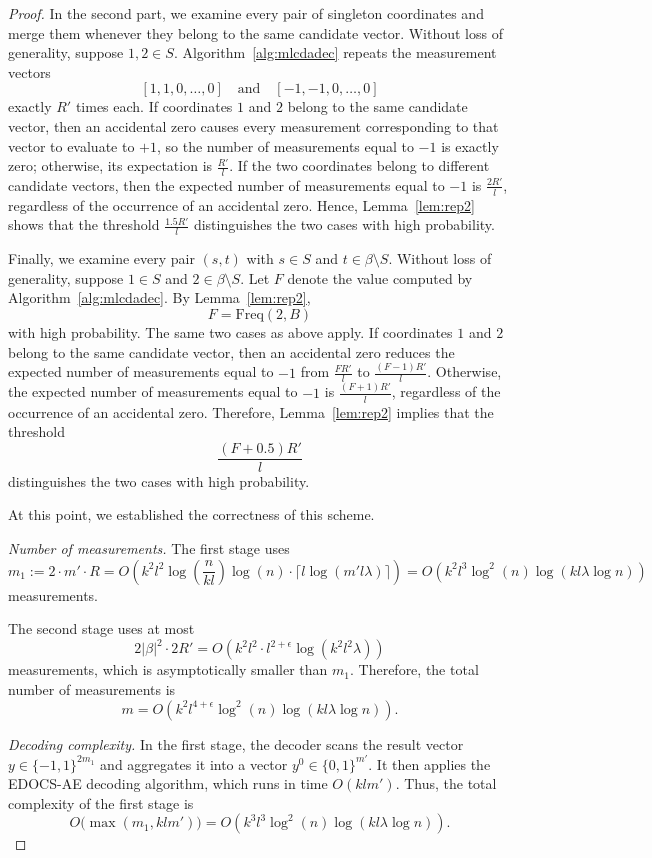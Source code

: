 \documentclass{article}
\begin{document}
\begin{proof}
In the second part, we examine every pair of singleton coordinates and merge them whenever they belong to the same candidate vector. Without loss of generality, suppose $1,2\in S$. Algorithm~\ref{alg:mlcdadec} repeats the measurement vectors
\[
[1,1,0,\ldots,0]
\quad\text{and}\quad
[-1,-1,0,\ldots,0]
\]
exactly $R'$ times each. If coordinates $1$ and $2$ belong to the same candidate vector, then an accidental zero causes every measurement corresponding to that vector to evaluate to $+1$, so the number of measurements equal to $-1$ is exactly zero; otherwise, its expectation is $\frac{R'}{l}$. If the two coordinates belong to different candidate vectors, then the expected number of measurements equal to $-1$ is $\frac{2R'}{l}$, regardless of the occurrence of an accidental zero. Hence, Lemma~\ref{lem:rep2} shows that the threshold $\frac{1.5R'}{l}$ distinguishes the two cases with high probability.

Finally, we examine every pair $(s,t)$ with $s\in S$ and $t\in\beta\setminus S$. Without loss of generality, suppose $1\in S$ and $2\in\beta\setminus S$. Let $F$ denote the value computed by Algorithm~\ref{alg:mlcdadec}. By Lemma~\ref{lem:rep2},
\[
F=\mathrm{Freq}(2,B)
\]
with high probability. The same two cases as above apply. If coordinates $1$ and $2$ belong to the same candidate vector, then an accidental zero reduces the expected number of measurements equal to $-1$ from $\frac{FR'}{l}$ to $\frac{(F-1)R'}{l}$. Otherwise, the expected number of measurements equal to $-1$ is $\frac{(F+1)R'}{l}$, regardless of the occurrence of an accidental zero. Therefore, Lemma~\ref{lem:rep2} implies that the threshold
\[
\frac{(F+0.5)R'}{l}
\]
distinguishes the two cases with high probability.

At this point, we established the correctness of this scheme.

\emph{Number of measurements.}
The first stage uses
\[
m_1 := 2\cdot m' \cdot R = O\!\left(k^2 l^2 \log\!\left(\frac{n}{kl}\right)\log (n) \cdot \lceil l \log(m' l \lambda)\rceil\right)
= O\!\left(k^2 l^3 \log^2 (n) \log(kl \lambda \log n)\right)
\]
measurements.

The second stage uses at most
\[
2|\beta|^2 \cdot 2R'
= O\!\left(k^2 l^2 \cdot l^{2+\epsilon} \log(k^2 l^2 \lambda)\right)
\]
measurements, which is asymptotically smaller than $m_1$. Therefore, the total number of measurements is
\[
m = O\!\left(k^2 l^{4+\epsilon} \log^2 (n) \log(kl \lambda \log n)\right).
\]

\medskip

\emph{Decoding complexity.}
In the first stage, the decoder scans the result vector $y \in \{-1,1\}^{2m_1}$ and aggregates it into a vector $y^0 \in \{0,1\}^{m'}$. It then applies the EDOCS-AE decoding algorithm, which runs in time $O(kl m')$. Thus, the total complexity of the first stage is
\[
O\bigl(\max(m_1, kl m')\bigr) = O\!\left(k^3 l^3 \log^2 (n)\log(kl\lambda\log n)\right).
\]


\end{proof}
\end{document}
